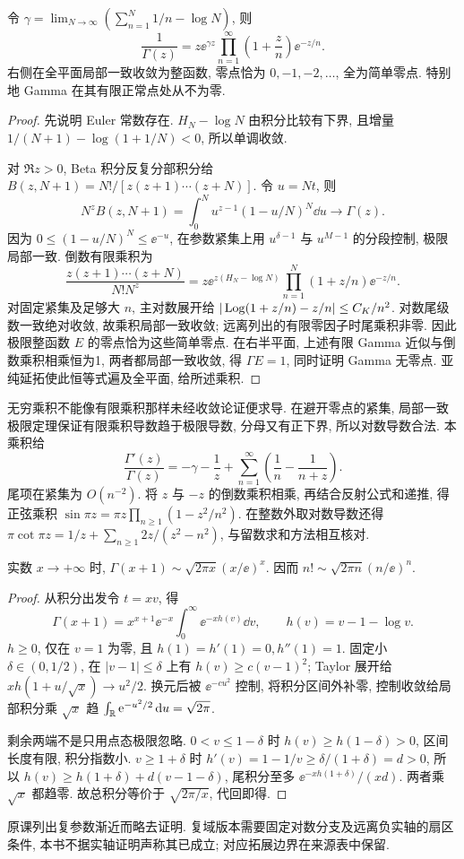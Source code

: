 \begin{theorem}\label{thm:gammaproduct}
令 $\gamma=\lim_{N\to\infty}(\sum_{n=1}^N1/n-\log N)$, 则
\[
\frac1{\Gamma(z)}=z\ee^{\gamma z}\prod_{n=1}^\infty\left(1+\frac zn\right)\ee^{-z/n}.
\]
右侧在全平面局部一致收敛为整函数, 零点恰为 $0,-1,-2,\ldots$, 全为简单零点. 特别地 Gamma 在其有限正常点处从不为零.
\end{theorem}
\begin{proof}
先说明 Euler 常数存在. $H_N-\log N$ 由积分比较有下界, 且增量 $1/(N+1)-\log(1+1/N)<0$, 所以单调收敛.

对 $\Re z>0$, Beta 积分反复分部积分给 $B(z,N+1)=N!/[z(z+1)\cdots(z+N)]$. 令 $u=Nt$, 则
\[
N^zB(z,N+1)=\int_0^N u^{z-1}(1-u/N)^N\dd u\longrightarrow\Gamma(z).
\]
因为 $0\le(1-u/N)^N\le\ee^{-u}$, 在参数紧集上用 $u^{\delta-1}$ 与 $u^{M-1}$ 的分段控制, 极限局部一致. 倒数有限乘积为
\[
\frac{z(z+1)\cdots(z+N)}{N!N^z}
 =z\ee^{z(H_N-\log N)}\prod_{n=1}^N(1+z/n)\ee^{-z/n}.
\]
对固定紧集及足够大 $n$, 主对数展开给 $|\operatorname{Log}(1+z/n)-z/n|\le C_K/n^2$. 对数尾级数一致绝对收敛, 故乘积局部一致收敛; 远离列出的有限零因子时尾乘积非零. 因此极限整函数 $E$ 的零点恰为这些简单零点. 在右半平面, 上述有限 Gamma 近似与倒数乘积相乘恒为1, 两者都局部一致收敛, 得 $\Gamma E=1$, 同时证明 Gamma 无零点. 亚纯延拓使此恒等式遍及全平面, 给所述乘积.
\end{proof}
无穷乘积不能像有限乘积那样未经收敛论证便求导. 在避开零点的紧集, 局部一致极限定理保证有限乘积导数趋于极限导数, 分母又有正下界, 所以对数导数合法. 本乘积给
\[
\frac{\Gamma'(z)}{\Gamma(z)}=-\gamma-\frac1z+
\sum_{n=1}^\infty\left(\frac1n-\frac1{n+z}\right).
\]
尾项在紧集为 $O(n^{-2})$. 将 $z$ 与 $-z$ 的倒数乘积相乘, 再结合反射公式和递推, 得正弦乘积 $\sin\pi z=\pi z\prod_{n\ge1}(1-z^2/n^2)$. 在整数外取对数导数还得 $\pi\cot\pi z=1/z+\sum_{n\ge1}2z/(z^2-n^2)$, 与留数求和方法相互核对.

\begin{theorem}
实数 $x\to+\infty$ 时, $\Gamma(x+1)\sim\sqrt{2\pi x}(x/\ee)^x$. 因而 $n!\sim\sqrt{2\pi n}(n/\ee)^n$.
\end{theorem}
\begin{proof}
从积分出发令 $t=xv$, 得
\[
\Gamma(x+1)=x^{x+1}\ee^{-x}\int_0^\infty
\ee^{-x h(v)}\dd v,\qquad h(v)=v-1-\log v.
\]
$h\ge0$, 仅在 $v=1$ 为零, 且 $h(1)=h'(1)=0,h''(1)=1$. 固定小 $\delta\in(0,1/2)$, 在 $|v-1|\le\delta$ 上有 $h(v)\ge c(v-1)^2$; Taylor 展开给 $xh(1+u/\sqrt x)\to u^2/2$. 换元后被 $\ee^{-cu^2}$ 控制, 将积分区间外补零, 控制收敛给局部积分乘 $\sqrt x$ 趋 $\int_\mathbb R\mathrm e^{-u^2/2}\,\mathrm d u=\sqrt{2\pi}$.

剩余两端不是只用点态极限忽略. $0<v\le1-\delta$ 时 $h(v)\ge h(1-\delta)>0$, 区间长度有限, 积分指数小. $v\ge1+\delta$ 时 $h'(v)=1-1/v\ge\delta/(1+\delta)=d>0$, 所以 $h(v)\ge h(1+\delta)+d(v-1-\delta)$, 尾积分至多 $\ee^{-xh(1+\delta)}/(xd)$. 两者乘 $\sqrt x$ 都趋零. 故总积分等价于 $\sqrt{2\pi/x}$, 代回即得.
\end{proof}
原课列出复参数渐近而略去证明. 复域版本需要固定对数分支及远离负实轴的扇区条件, 本书不据实轴证明声称其已成立; 对应拓展边界在来源表中保留.

